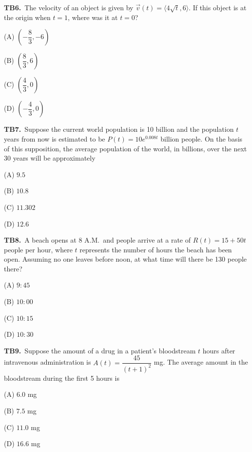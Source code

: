 \documentclass[11pt]{article}
\begin{document}
\bigskip\noindent\textbf{TB6.}\ The velocity of an object is given by $\vec{v}(t)=\langle 4\sqrt{t}, 6\rangle$. If this object is at the origin when $t=1$, where was it at $t=0$?
\begin{list}{}{\setlength{\leftmargin}{3em}\setlength{\labelwidth}{2.5em}\setlength{\itemsep}{0pt}\setlength{\topsep}{2pt}}
\item[(A)] $\left(-\dfrac{8}{3},-6\right)$
\item[(B)] $\left(\dfrac{8}{3},6\right)$
\item[(C)] $\left(\dfrac{4}{3},0\right)$
\item[(D)] $\left(-\dfrac{4}{3},0\right)$
\end{list}

\bigskip\noindent\textbf{TB7.}\ Suppose the current world population is 10 billion and the population $t$ years from now is estimated to be $P(t)=10e^{0.008t}$ billion people. On the basis of this supposition, the average population of the world, in billions, over the next 30 years will be approximately
\begin{list}{}{\setlength{\leftmargin}{3em}\setlength{\labelwidth}{2.5em}\setlength{\itemsep}{0pt}\setlength{\topsep}{2pt}}
\item[(A)] $9.5$
\item[(B)] $10.8$
\item[(C)] $11.302$
\item[(D)] $12.6$
\end{list}

\bigskip\noindent\textbf{TB8.}\ A beach opens at 8 A.M.\ and people arrive at a rate of $R(t)=15+50t$ people per hour, where $t$ represents the number of hours the beach has been open. Assuming no one leaves before noon, at what time will there be 130 people there?
\begin{list}{}{\setlength{\leftmargin}{3em}\setlength{\labelwidth}{2.5em}\setlength{\itemsep}{0pt}\setlength{\topsep}{2pt}}
\item[(A)] $9{:}45$
\item[(B)] $10{:}00$
\item[(C)] $10{:}15$
\item[(D)] $10{:}30$
\end{list}

\bigskip\noindent\textbf{TB9.}\ Suppose the amount of a drug in a patient's bloodstream $t$ hours after intravenous administration is $A(t)=\dfrac{45}{(t+1)^2}$ mg. The average amount in the bloodstream during the first 5 hours is
\begin{list}{}{\setlength{\leftmargin}{3em}\setlength{\labelwidth}{2.5em}\setlength{\itemsep}{0pt}\setlength{\topsep}{2pt}}
\item[(A)] $6.0$ mg
\item[(B)] $7.5$ mg
\item[(C)] $11.0$ mg
\item[(D)] $16.6$ mg
\end{list}
\end{document}
